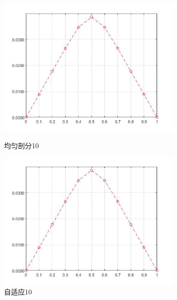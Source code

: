 \documentclass[12pt,fontset=mac]{ctexart}
\begin{document}
\begin{figure}[H]
	\centering
	\begin{minipage}[t]{0.48\textwidth}
		\centering
		\includegraphics[width=9cm]{方程二，均匀剖分10.jpg}
		\caption{均匀剖分10}
	\end{minipage}
	\begin{minipage}[t]{0.48\textwidth}
		\centering
		\includegraphics[width=9cm]{方程二，自适应10.jpg}
		\caption{自适应10}
	\end{minipage}
\end{figure}
\end{document}
